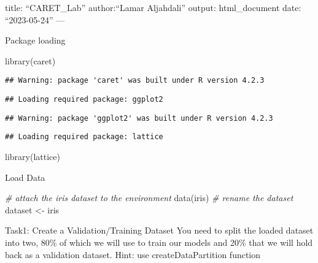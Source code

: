 \documentclass[
]{article}
\author{}
\date{\vspace{-2.5em}}
\newenvironment{Shaded}{\begin{snugshade}}{\end{snugshade}}
\newcommand{\CommentTok}[1]{\textcolor[rgb]{0.56,0.35,0.01}{\textit{#1}}}
\newcommand{\FunctionTok}[1]{\textcolor[rgb]{0.00,0.00,0.00}{#1}}
\newcommand{\NormalTok}[1]{#1}
\newcommand{\OtherTok}[1]{\textcolor[rgb]{0.56,0.35,0.01}{#1}}
\begin{document}
title: ``CARET\_Lab'' author:``Lamar Aljahdali'' output: html\_document
date: ``2023-05-24'' ---

Package loading

\begin{Shaded}
\begin{Highlighting}[]
\FunctionTok{library}\NormalTok{(caret)}
\end{Highlighting}
\end{Shaded}

\begin{verbatim}
## Warning: package 'caret' was built under R version 4.2.3
\end{verbatim}

\begin{verbatim}
## Loading required package: ggplot2
\end{verbatim}

\begin{verbatim}
## Warning: package 'ggplot2' was built under R version 4.2.3
\end{verbatim}

\begin{verbatim}
## Loading required package: lattice
\end{verbatim}

\begin{Shaded}
\begin{Highlighting}[]
\FunctionTok{library}\NormalTok{(lattice)}
\end{Highlighting}
\end{Shaded}

Load Data

\begin{Shaded}
\begin{Highlighting}[]
\CommentTok{\# attach the iris dataset to the environment}
\FunctionTok{data}\NormalTok{(iris)}
\CommentTok{\# rename the dataset}
\NormalTok{dataset }\OtherTok{\textless{}{-}}\NormalTok{ iris}
\end{Highlighting}
\end{Shaded}

Task1: Create a Validation/Training Dataset You need to split the loaded
dataset into two, 80\% of which we will use to train our models and 20\%
that we will hold back as a validation dataset. Hint: use
createDataPartition function
\end{document}
